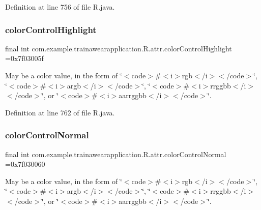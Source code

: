 Definition at line 756 of file R.\+java.

\mbox{\label{classcom_1_1example_1_1trainawearapplication_1_1_r_1_1attr_a344d9549b94d0535748d8999fb8ad591}} 
\subsubsection{\texorpdfstring{colorControlHighlight}{colorControlHighlight}}
{\footnotesize\ttfamily final int com.\+example.\+trainawearapplication.\+R.\+attr.\+color\+Control\+Highlight =0x7f03005f\hspace{0.3cm}{\ttfamily [static]}}

May be a color value, in the form of \char`\"{}$<$code$>$\#$<$i$>$rgb$<$/i$>$$<$/code$>$\char`\"{}, \char`\"{}$<$code$>$\#$<$i$>$argb$<$/i$>$$<$/code$>$\char`\"{}, \char`\"{}$<$code$>$\#$<$i$>$rrggbb$<$/i$>$$<$/code$>$\char`\"{}, or \char`\"{}$<$code$>$\#$<$i$>$aarrggbb$<$/i$>$$<$/code$>$\char`\"{}. 

Definition at line 762 of file R.\+java.

\mbox{\label{classcom_1_1example_1_1trainawearapplication_1_1_r_1_1attr_aa28d48cdf44eafacbd97a92def381f28}} 
\subsubsection{\texorpdfstring{colorControlNormal}{colorControlNormal}}
{\footnotesize\ttfamily final int com.\+example.\+trainawearapplication.\+R.\+attr.\+color\+Control\+Normal =0x7f030060\hspace{0.3cm}{\ttfamily [static]}}

May be a color value, in the form of \char`\"{}$<$code$>$\#$<$i$>$rgb$<$/i$>$$<$/code$>$\char`\"{}, \char`\"{}$<$code$>$\#$<$i$>$argb$<$/i$>$$<$/code$>$\char`\"{}, \char`\"{}$<$code$>$\#$<$i$>$rrggbb$<$/i$>$$<$/code$>$\char`\"{}, or \char`\"{}$<$code$>$\#$<$i$>$aarrggbb$<$/i$>$$<$/code$>$\char`\"{}. 

